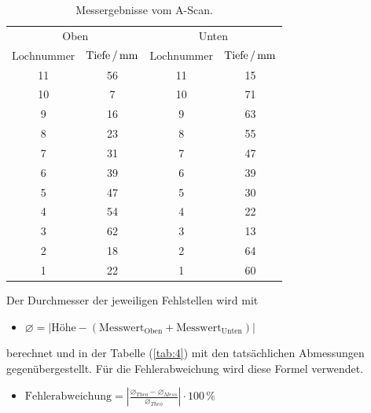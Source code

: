 \begin{table}[H]
  \centering
  \caption{Messergebnisse vom A-Scan.}
  \label{tab:3}
  \begin{tabular}{c c c c}
    \toprule
    \multicolumn{2}{c}{Oben} & \multicolumn{2}{c}{Unten} \\
    \cmidrule(lr){1-2}\cmidrule(lr){3-4}
    $\text{Lochnummer}$ & $\text{Tiefe} \,/\, \si[per-mode=fraction]{\milli\meter}$ & $\text{Lochnummer}$ & $\text{Tiefe} \,/\, \si[per-mode=fraction]{\milli\meter}$\\
    \midrule
    11  & 56 & 11 & 15\\
    10  & 7  & 10 & 71\\
    9   & 16 & 9 & 63\\
    8   & 23 & 8 & 55\\
    7   & 31 & 7 & 47\\
    6   & 39 & 6 & 39\\
    5   & 47 & 5 & 30\\
    4   & 54 & 4 & 22\\
    3   & 62 & 3 & 13\\
    2   & 18 & 2 & 64\\
    1   & 22 & 1 & 60\\
  \bottomrule
  \end{tabular}
\end{table}

Der Durchmesser der jeweiligen Fehlstellen wird mit
\begin{itemize}
  \item $\diameter = |\text{Höhe} - (\text{Messwert}_{\text{Oben}} + \text{Messwert}_{\text{Unten}} )|$
\end{itemize}
berechnet und in der Tabelle (\ref{tab:4}) mit den tatsächlichen Abmessungen gegenübergestellt.
Für die Fehlerabweichung wird diese Formel verwendet.
\begin{itemize}
  \item $\text{Fehlerabweichung} = |\frac{\diameter_{Theo} - \diameter_{Mess}}{\diameter_{Theo}}| \cdot 100 \, \%$
\end{itemize}

